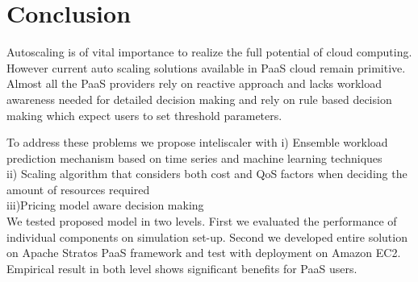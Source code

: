 \section{Conclusion}

Autoscaling is of vital importance to realize the full potential of cloud computing. However current auto scaling solutions available in PaaS cloud remain primitive. Almost all the PaaS providers rely on reactive approach and lacks workload awareness needed for detailed decision making and rely on rule based decision making which expect users to set threshold parameters. 

To address these problems we propose inteliscaler with 
i)  Ensemble workload prediction mechanism based on time series and machine learning techniques \\ 
ii) Scaling algorithm that considers both cost and QoS factors when deciding the amount of resources required\\
iii)Pricing model aware decision making\\

We tested proposed model in two levels. First we evaluated the performance of individual components on simulation set-up. Second we developed entire solution on Apache Stratos PaaS framework and test with deployment on Amazon EC2. Empirical result in both level shows significant benefits for PaaS users.



